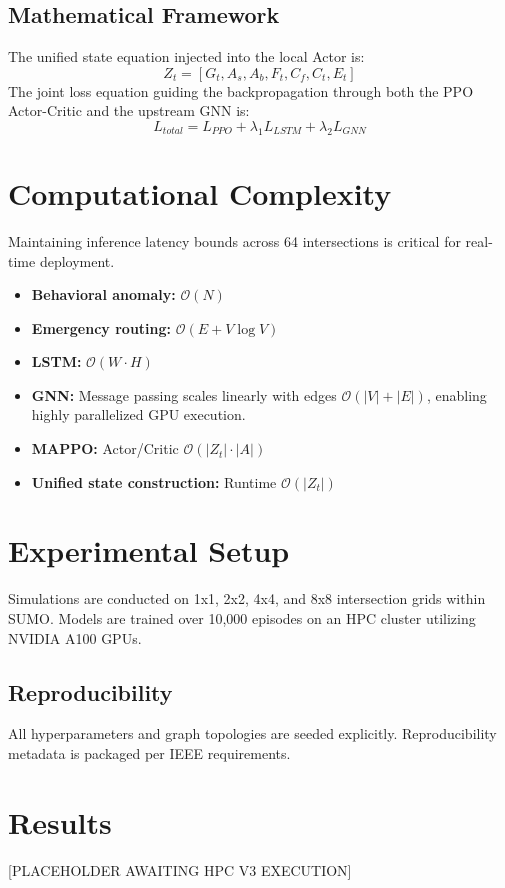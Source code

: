 \documentclass{ieeeaccess}
\begin{document}
\subsection{Mathematical Framework}
The unified state equation injected into the local Actor is:
$$Z_t = [G_t, A_s, A_b, F_t, C_f, C_t, E_t]$$
The joint loss equation guiding the backpropagation through both the PPO Actor-Critic and the upstream GNN is:
$$L_{total} = L_{PPO} + \lambda_1 L_{LSTM} + \lambda_2 L_{GNN}$$

\section{Computational Complexity}
\label{sec:complexity}
Maintaining inference latency bounds across 64 intersections is critical for real-time deployment.
\begin{itemize}
    \item \textbf{Behavioral anomaly:} $\mathcal{O}(N)$
    \item \textbf{Emergency routing:} $\mathcal{O}(E + V \log V)$
    \item \textbf{LSTM:} $\mathcal{O}(W \cdot H)$
    \item \textbf{GNN:} Message passing scales linearly with edges $\mathcal{O}(|V| + |E|)$, enabling highly parallelized GPU execution.
    \item \textbf{MAPPO:} Actor/Critic $\mathcal{O}(|Z_t| \cdot |A|)$
    \item \textbf{Unified state construction:} Runtime $\mathcal{O}(|Z_t|)$
\end{itemize}

\section{Experimental Setup}
\label{sec:experimental_setup}
Simulations are conducted on 1x1, 2x2, 4x4, and 8x8 intersection grids within SUMO. Models are trained over 10,000 episodes on an HPC cluster utilizing NVIDIA A100 GPUs.
\subsection{Reproducibility}
All hyperparameters and graph topologies are seeded explicitly. Reproducibility metadata is packaged per IEEE requirements.

\section{Results}
\label{sec:results}
[PLACEHOLDER AWAITING HPC V3 EXECUTION]
\end{document}
